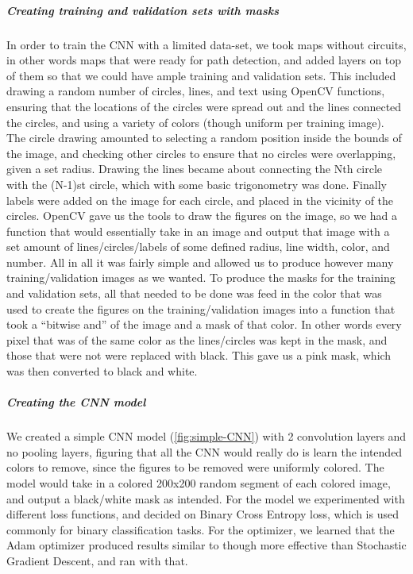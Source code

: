 \documentclass[a4paper,12pt]{extarticle}
\begin{document}
\subparagraph{Creating training and validation sets with masks\\}

In order to train the CNN with a limited data-set, we took maps without circuits, in other words maps that were ready for path detection, and added layers on top of them so that we could have ample training and validation sets. This included drawing a random number of circles, lines, and text using OpenCV functions, ensuring that the locations of the circles were spread out and the lines connected the circles, and using a variety of colors (though uniform per training image). The circle drawing amounted to selecting a random position inside the bounds of the image, and checking other circles to ensure that no circles were overlapping, given a set radius. Drawing the lines became about connecting the Nth circle with the (N-1)st circle, which with some basic trigonometry was done. Finally labels were added on the image for each circle, and placed in the vicinity of the circles. OpenCV gave us the tools to draw the figures on the image, so we had a function that would essentially take in an image and output that image with a set amount of lines/circles/labels of some defined radius, line width, color, and number. All in all it was fairly simple and allowed us to produce however many training/validation images as we wanted. To produce the masks for the training and validation sets, all that needed to be done was feed in the color that was used to create the figures on the training/validation images into a function that took a “bitwise and” of the image and a mask of that color. In other words every pixel that was of the same color as the lines/circles was kept in the mask, and those that were not were replaced with black. This gave us a pink mask, which was then converted to black and white.

\subparagraph{Creating the CNN model\\}
We created a simple CNN model (\cref{fig:simple-CNN}) with 2 convolution layers and no pooling layers, figuring that all the CNN would really do is learn the intended colors to remove, since the figures to be removed were uniformly colored. The model would take in a colored 200x200 random segment of each colored image, and output a black/white mask as intended. For the model we experimented with different loss functions, and decided on Binary Cross Entropy loss, which is used commonly for binary classification tasks. For the optimizer, we learned that the Adam optimizer produced results similar to though more effective than Stochastic Gradient Descent, and ran with that.
\end{document}
